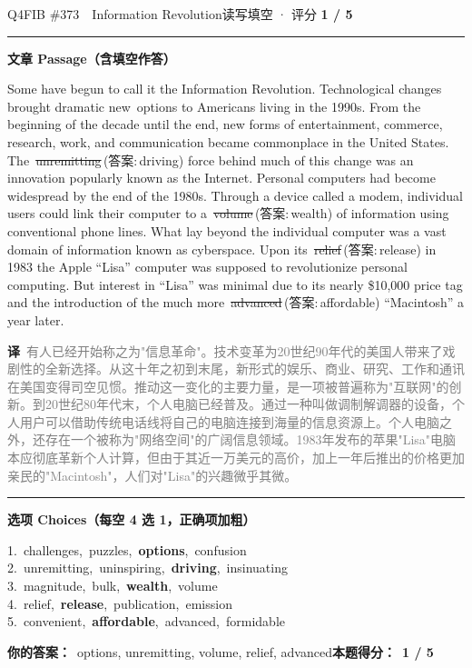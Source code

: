 \documentclass[11pt]{article}
\newcommand{\ptesub}[1]{%
  \par\needspace{2\baselineskip}\smallskip
  {\color{cAccent}\rule[-0.2ex]{3pt}{1.05em}}\hspace{6pt}%
  {\bfseries\color{cHead}#1}\par\nopagebreak\smallskip}
\newcommand{\zh}[1]{{\footnotesize\textcolor{cNote}{\textbf{译}}\ \textcolor{gray}{#1}}}
\newcommand{\rok}[1]{{\color{cFix}\ding{51}\,#1}}                 %
\newcommand{\rno}[2]{{\color{cWrong}\ding{55}\,\sout{#1}}\,{\footnotesize\color{cFix}(答案:\,#2)}}  %
\begin{document}
\begin{qblock}{Q4\quad FIB \#373\ \ Information Revolution}{读写填空 · 评分 \textcolor{cAccent}{\bfseries 1 / 5}}
\ptesub{文章 Passage（含填空作答）}
\begin{promptbox}
Some have begun to call it the Information Revolution. Technological changes brought dramatic new \rok{options} to Americans living in the 1990s. From the beginning of the decade until the end, new forms of entertainment, commerce, research, work, and communication became commonplace in the United States. The \rno{unremitting}{driving} force behind much of this change was an innovation popularly known as the Internet. Personal computers had become widespread by the end of the 1980s. Through a device called a modem, individual users could link their computer to a \rno{volume}{wealth} of information using conventional phone lines. What lay beyond the individual computer was a vast domain of information known as cyberspace. Upon its \rno{relief}{release} in 1983 the Apple ``Lisa'' computer was supposed to revolutionize personal computing. But interest in ``Lisa'' was minimal due to its nearly \$10,000 price tag and the introduction of the much more \rno{advanced}{affordable} ``Macintosh'' a year later.
\end{promptbox}
\zh{有人已经开始称之为"信息革命"。技术变革为20世纪90年代的美国人带来了戏剧性的全新选择。从这十年之初到末尾，新形式的娱乐、商业、研究、工作和通讯在美国变得司空见惯。推动这一变化的主要力量，是一项被普遍称为"互联网"的创新。到20世纪80年代末，个人电脑已经普及。通过一种叫做调制解调器的设备，个人用户可以借助传统电话线将自己的电脑连接到海量的信息资源上。个人电脑之外，还存在一个被称为"网络空间"的广阔信息领域。1983年发布的苹果"Lisa"电脑本应彻底革新个人计算，但由于其近一万美元的高价，加上一年后推出的价格更加亲民的"Macintosh"，人们对"Lisa"的兴趣微乎其微。}
\ptesub{选项 Choices（每空 4 选 1，正确项加粗）}
{\small
1.\ challenges,\ puzzles,\ \textbf{options},\ confusion\\
2.\ unremitting,\ uninspiring,\ \textbf{driving},\ insinuating\\
3.\ magnitude,\ bulk,\ \textbf{wealth},\ volume\\
4.\ relief,\ \textbf{release},\ publication,\ emission\\
5.\ convenient,\ \textbf{affordable},\ advanced,\ formidable}
\par\smallskip
\textbf{你的答案：}\ options, {\color{cWrong}unremitting, volume, relief, advanced}\qquad\textbf{本题得分：}\ {\color{cAccent}\bfseries 1 / 5}
\end{qblock}
\end{document}
